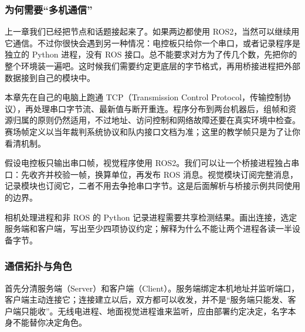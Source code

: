 \newenvironment{commcode}{\par\medskip\noindent\begin{minipage}{\linewidth}}{\end{minipage}\par\smallskip}
\subsubsection{为何需要“多机通信”}
上一章我们已经把节点和话题接起来了。如果两边都使用 ROS2，当然可以继续用它通信。不过你很快会遇到另一种情况：电控板只给你一个串口，或者记录程序是独立的 Python 进程，没有 ROS 接口。总不能要求对方为了传几个数，先把你的整个环境装一遍吧。这时候我们需要约定更底层的字节格式，再用桥接进程把外部数据接到自己的模块中。

本章先在自己的电脑上跑通 TCP（Transmission Control Protocol，传输控制协议），再处理串口字节流、最新值与断开重连。程序分布到两台机器后，组帧和资源归属的原则仍然适用，不过地址、访问控制和网络故障还要在真实环境中检查。赛场帧定义以当年裁判系统协议和队内接口文档为准；这里的教学帧只是为了让你看清机制。
\begin{example}[先画出谁负责读取设备]
假设电控板只输出串口帧，视觉程序使用 ROS2。我们可以让一个桥接进程独占串口：先收齐并校验一帧，换算单位，再发布 ROS 消息。视觉模块订阅完整消息，记录模块也订阅它，二者不用去争抢串口字节。这是后面解析与桥接示例共同使用的边界。
\end{example}
\begin{exercise}\label{ex:v2-comm-boundary}
相机处理进程和非 ROS 的 Python 记录进程需要共享检测结果。画出连接，选定服务端和客户端，写出至少四项协议约定；解释为什么不能让两个进程各读一半设备字节。
\end{exercise}

\subsubsection{通信拓扑与角色}
首先分清服务端（Server）和客户端（Client）。服务端绑定本机地址并监听端口，客户端主动连接它；连接建立以后，双方都可以收发，并不是“服务端只能发、客户端只能收”。无线电进程、地面视觉进程谁来监听，应由部署约定决定，名字本身不能替你决定角色。

